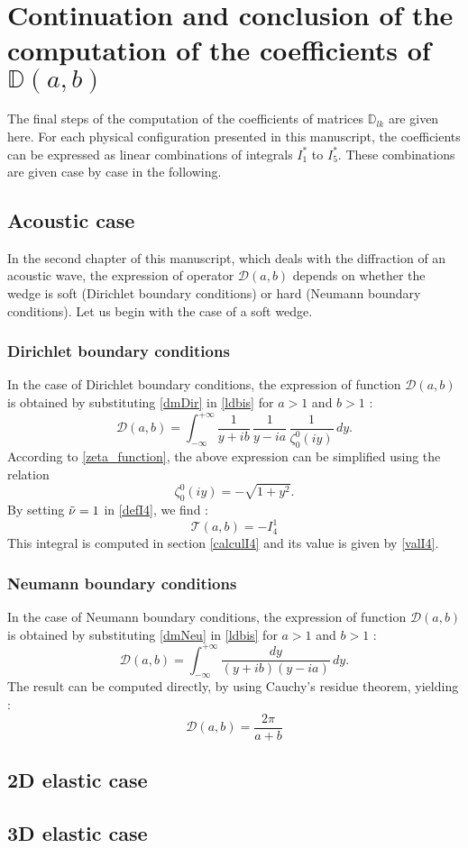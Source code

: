 \section{Continuation and conclusion of the computation of the coefficients of $\mathbb{D}(a,b)$}
\label{fincalculs}
The final steps of the computation of the coefficients of matrices $\mathbb{D}_{lk}$ are given here. For each physical configuration presented in this manuscript, the coefficients can be expressed as linear combinations of integrals $I_1^*$ to $I_5^*$. These combinations are given case by case in the following.

\subsection{Acoustic case}
\label{finalDac}
In the second chapter of this manuscript, which deals with the diffraction of an acoustic wave, the expression of operator $\mathcal{D}(a,b)$ depends on whether the wedge is soft (Dirichlet boundary conditions) or hard (Neumann boundary conditions). Let us begin with the case of a soft wedge.  
\subsubsection{Dirichlet boundary conditions}
\label{finalDacDir}
In the case of Dirichlet boundary conditions, the expression of function $\mathcal{D}(a,b)$ is obtained by substituting \eqref{dmDir} in \eqref{ldbis} for $a>1$ and $b>1$ :
\begin{equation}
\mathcal{D}(a,b) = \int_{-\infty}^{+\infty} \dfrac{1}{ y+ib} \, \dfrac{1}{y -i a} \,\dfrac{1}{\zeta_0^0(iy)} \, dy . 
\end{equation}
According to \eqref{zeta_function}, the above expression can be simplified using the relation
\begin{equation}
\zeta_0^0(iy)= - \sqrt{1+y^2}.
\label{zeta0iy}
\end{equation}
By setting $\tilde{\nu}=1$ in \eqref{defI4}, we find :
\begin{equation}
\mathcal{T}(a,b)=-I_4^1
\end{equation}
This integral is computed in section \ref{calculI4} and its value is given by \eqref{valI4}.
\subsubsection{Neumann boundary conditions}
\label{finalDacNeu}
In the case of Neumann boundary conditions, the expression of function $\mathcal{D}(a,b)$ is obtained by substituting \eqref{dmNeu} in \eqref{ldbis} for $a>1$ and $b>1$ :
\begin{equation}
\mathcal{D}(a,b) = \int_{-\infty}^{+\infty} \dfrac{dy}{ (y+ib)(y-ia)} \, dy .
\end{equation}
The result can be computed directly, by using Cauchy's residue theorem, yielding :
\begin{equation}
\mathcal{D}(a,b)=\dfrac{2\pi}{a+b}
\end{equation}

\subsection{2D elastic case}
\label{finalD2D}
\subsection{3D elastic case}
\label{finalD3D}